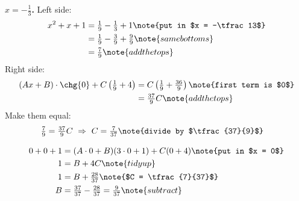 
\textbf{$x = -\frac13$.} Left side:
\begin{align*}
x^2 + x + 1 &= \tfrac19 - \tfrac13 + 1 \note{put in $x = -\tfrac13$} \\
&= \tfrac19 - \tfrac39 + \tfrac99 \note{same bottoms} \\
&= \tfrac79 \note{add the tops}
\end{align*}
Right side:
\begin{align*}
(Ax+B)\cdot\chg{0} + C\left(\tfrac19 + 4\right) &= C\left(\tfrac19 + \tfrac{36}{9}\right) \note{first term is $0$} \\
&= \tfrac{37}{9}C \note{add the tops}
\end{align*}
Make them equal:
\begin{align*}
\tfrac79 = \tfrac{37}{9}C \ \Rightarrow \ C &= \tfrac{7}{37} \note{divide by $\tfrac{37}{9}$}
\end{align*}

\begin{align*}
0 + 0 + 1 &= (A\cdot 0 + B)(3\cdot 0 + 1) + C(0 + 4) \note{put in $x = 0$} \\
1 &= B + 4C \note{tidy up} \\
1 &= B + \tfrac{28}{37} \note{$C = \tfrac{7}{37}$} \\
B &= \tfrac{37}{37} - \tfrac{28}{37} = \tfrac{9}{37} \note{subtract}
\end{align*}
